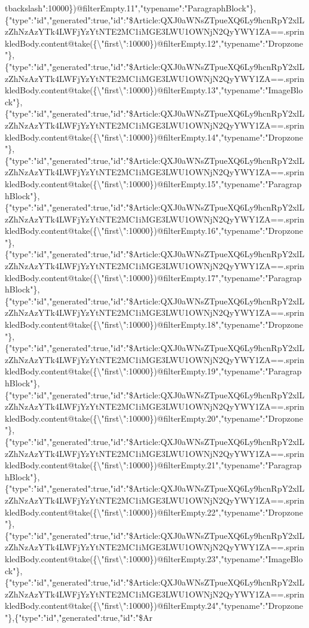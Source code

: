 tbackslash{}":10000\})@filterEmpty.11","typename":"ParagraphBlock"\},\{"type":"id","generated":true,"id":"\$Article:QXJ0aWNsZTpueXQ6Ly9hcnRpY2xlLzZhNzAzYTk4LWFjYzYtNTE2MC1iMGE3LWU1OWNjN2QyYWY1ZA==.sprinkledBody.content@take(\{\textbackslash{}"first\textbackslash{}":10000\})@filterEmpty.12","typename":"Dropzone"\},\{"type":"id","generated":true,"id":"\$Article:QXJ0aWNsZTpueXQ6Ly9hcnRpY2xlLzZhNzAzYTk4LWFjYzYtNTE2MC1iMGE3LWU1OWNjN2QyYWY1ZA==.sprinkledBody.content@take(\{\textbackslash{}"first\textbackslash{}":10000\})@filterEmpty.13","typename":"ImageBlock"\},\{"type":"id","generated":true,"id":"\$Article:QXJ0aWNsZTpueXQ6Ly9hcnRpY2xlLzZhNzAzYTk4LWFjYzYtNTE2MC1iMGE3LWU1OWNjN2QyYWY1ZA==.sprinkledBody.content@take(\{\textbackslash{}"first\textbackslash{}":10000\})@filterEmpty.14","typename":"Dropzone"\},\{"type":"id","generated":true,"id":"\$Article:QXJ0aWNsZTpueXQ6Ly9hcnRpY2xlLzZhNzAzYTk4LWFjYzYtNTE2MC1iMGE3LWU1OWNjN2QyYWY1ZA==.sprinkledBody.content@take(\{\textbackslash{}"first\textbackslash{}":10000\})@filterEmpty.15","typename":"ParagraphBlock"\},\{"type":"id","generated":true,"id":"\$Article:QXJ0aWNsZTpueXQ6Ly9hcnRpY2xlLzZhNzAzYTk4LWFjYzYtNTE2MC1iMGE3LWU1OWNjN2QyYWY1ZA==.sprinkledBody.content@take(\{\textbackslash{}"first\textbackslash{}":10000\})@filterEmpty.16","typename":"Dropzone"\},\{"type":"id","generated":true,"id":"\$Article:QXJ0aWNsZTpueXQ6Ly9hcnRpY2xlLzZhNzAzYTk4LWFjYzYtNTE2MC1iMGE3LWU1OWNjN2QyYWY1ZA==.sprinkledBody.content@take(\{\textbackslash{}"first\textbackslash{}":10000\})@filterEmpty.17","typename":"ParagraphBlock"\},\{"type":"id","generated":true,"id":"\$Article:QXJ0aWNsZTpueXQ6Ly9hcnRpY2xlLzZhNzAzYTk4LWFjYzYtNTE2MC1iMGE3LWU1OWNjN2QyYWY1ZA==.sprinkledBody.content@take(\{\textbackslash{}"first\textbackslash{}":10000\})@filterEmpty.18","typename":"Dropzone"\},\{"type":"id","generated":true,"id":"\$Article:QXJ0aWNsZTpueXQ6Ly9hcnRpY2xlLzZhNzAzYTk4LWFjYzYtNTE2MC1iMGE3LWU1OWNjN2QyYWY1ZA==.sprinkledBody.content@take(\{\textbackslash{}"first\textbackslash{}":10000\})@filterEmpty.19","typename":"ParagraphBlock"\},\{"type":"id","generated":true,"id":"\$Article:QXJ0aWNsZTpueXQ6Ly9hcnRpY2xlLzZhNzAzYTk4LWFjYzYtNTE2MC1iMGE3LWU1OWNjN2QyYWY1ZA==.sprinkledBody.content@take(\{\textbackslash{}"first\textbackslash{}":10000\})@filterEmpty.20","typename":"Dropzone"\},\{"type":"id","generated":true,"id":"\$Article:QXJ0aWNsZTpueXQ6Ly9hcnRpY2xlLzZhNzAzYTk4LWFjYzYtNTE2MC1iMGE3LWU1OWNjN2QyYWY1ZA==.sprinkledBody.content@take(\{\textbackslash{}"first\textbackslash{}":10000\})@filterEmpty.21","typename":"ParagraphBlock"\},\{"type":"id","generated":true,"id":"\$Article:QXJ0aWNsZTpueXQ6Ly9hcnRpY2xlLzZhNzAzYTk4LWFjYzYtNTE2MC1iMGE3LWU1OWNjN2QyYWY1ZA==.sprinkledBody.content@take(\{\textbackslash{}"first\textbackslash{}":10000\})@filterEmpty.22","typename":"Dropzone"\},\{"type":"id","generated":true,"id":"\$Article:QXJ0aWNsZTpueXQ6Ly9hcnRpY2xlLzZhNzAzYTk4LWFjYzYtNTE2MC1iMGE3LWU1OWNjN2QyYWY1ZA==.sprinkledBody.content@take(\{\textbackslash{}"first\textbackslash{}":10000\})@filterEmpty.23","typename":"ImageBlock"\},\{"type":"id","generated":true,"id":"\$Article:QXJ0aWNsZTpueXQ6Ly9hcnRpY2xlLzZhNzAzYTk4LWFjYzYtNTE2MC1iMGE3LWU1OWNjN2QyYWY1ZA==.sprinkledBody.content@take(\{\textbackslash{}"first\textbackslash{}":10000\})@filterEmpty.24","typename":"Dropzone"\},\{"type":"id","generated":true,"id":"\$Ar